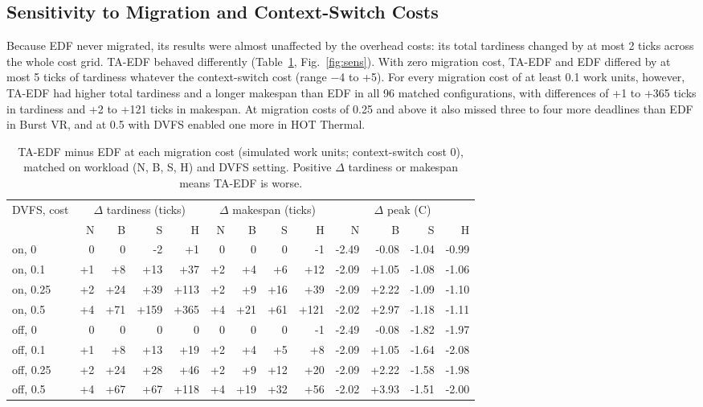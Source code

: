 \documentclass[conference]{IEEEtran}
\begin{document}
\subsection{Sensitivity to Migration and Context-Switch Costs}\label{sec:res-sens}
Because EDF never migrated, its results were almost unaffected by the overhead costs: its total tardiness changed by at most 2 ticks across the whole cost grid. TA-EDF behaved differently (Table~\ref{tab:sens}, Fig.~\ref{fig:sens}). With zero migration cost, TA-EDF and EDF differed by at most 5 ticks of tardiness whatever the context-switch cost (range $-$4 to +5). For every migration cost of at least 0.1 work units, however, TA-EDF had higher total tardiness and a longer makespan than EDF in all 96 matched configurations, with differences of +1 to +365 ticks in tardiness and +2 to +121 ticks in makespan. At migration costs of 0.25 and above it also missed three to four more deadlines than EDF in Burst VR, and at 0.5 with DVFS enabled one more in HOT Thermal.

\begin{table}[!t]
\centering
\scriptsize
\caption{TA-EDF minus EDF at each migration cost (simulated work units; context-switch cost 0), matched on workload (N, B, S, H) and DVFS setting. Positive $\Delta$ tardiness or makespan means TA-EDF is worse.}
\label{tab:sens}
\setlength{\tabcolsep}{3pt}
\begin{tabular}{lrrrrrrrrrrrr}
\toprule
DVFS, cost & \multicolumn{4}{c}{$\Delta$ tardiness (ticks)} & \multicolumn{4}{c}{$\Delta$ makespan (ticks)} & \multicolumn{4}{c}{$\Delta$ peak (\textdegree{}C)} \\
\cmidrule(lr){2-5} \cmidrule(lr){6-9} \cmidrule(lr){10-13}
 & N & B & S & H & N & B & S & H & N & B & S & H \\
\midrule
on, 0 & 0 & 0 & -2 & +1 & 0 & 0 & 0 & -1 & -2.49 & -0.08 & -1.04 & -0.99 \\
on, 0.1 & +1 & +8 & +13 & +37 & +2 & +4 & +6 & +12 & -2.09 & +1.05 & -1.08 & -1.06 \\
on, 0.25 & +2 & +24 & +39 & +113 & +2 & +9 & +16 & +39 & -2.09 & +2.22 & -1.09 & -1.10 \\
on, 0.5 & +4 & +71 & +159 & +365 & +4 & +21 & +61 & +121 & -2.02 & +2.97 & -1.18 & -1.11 \\
\midrule
off, 0 & 0 & 0 & 0 & 0 & 0 & 0 & 0 & -1 & -2.49 & -0.08 & -1.82 & -1.97 \\
off, 0.1 & +1 & +8 & +13 & +19 & +2 & +4 & +5 & +8 & -2.09 & +1.05 & -1.64 & -2.08 \\
off, 0.25 & +2 & +24 & +28 & +46 & +2 & +9 & +12 & +20 & -2.09 & +2.22 & -1.58 & -1.98 \\
off, 0.5 & +4 & +67 & +67 & +118 & +4 & +19 & +32 & +56 & -2.02 & +3.93 & -1.51 & -2.00 \\
\bottomrule
\end{tabular}
\end{table}
\end{document}
